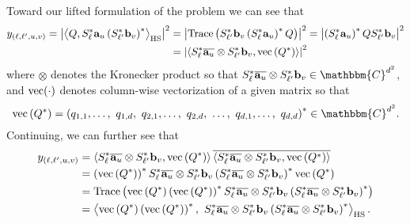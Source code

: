 \documentclass[]{spie}  %
\def \a {\mathbf a}
\def \b {\mathbf b}
\begin{document}
Toward our lifted formulation of the problem we can see that
\begin{align*}
y_{(\ell,\ell',u,v)} = \left| \left\langle Q, S^*_{\ell} \a_u \left(S^*_{\ell'} \b_v \right)^* \right\rangle_{\rm HS} \right|^2 &= \left| {\rm Trace}\left( S^*_{\ell'} \b_v  \left(S^*_{\ell} \a_u \right)^*Q \right) \right|^2  = \left|\left(S^*_{\ell} \a_u \right)^* Q S^*_{\ell'} \b_v \right|^2\\ 
&= \left| \left\langle S^*_{\ell} \overline{\a_u} \otimes S^*_{\ell'} \b_v, {\rm vec} \left(Q^* \right) \right\rangle \right|^2
\end{align*}
where $\otimes$ denotes the Kronecker product so that $S^*_{\ell} \overline{\a_u} \otimes S^*_{\ell'} \b_v \in \mathbbm{C}^{d^2}$, and ${\rm vec}(\cdot)$ denotes column-wise vectorization of a given matrix so that 
$${\rm vec} \left(Q^* \right) = \left( q_{1,1}, \dots, ~q_{1,d}, ~q_{2,1}, \dots, ~q_{2,d}, ~\dots, ~q_{d,1}, \dots, ~q_{d,d} \right)^* \in \mathbbm{C}^{d^2}.$$
Continuing, we can further see that 
\begin{align*}
y_{(\ell,\ell',u,v)} &=\left\langle S^*_{\ell} \overline{\a_u} \otimes S^*_{\ell'} \b_v, {\rm vec} \left(Q^* \right) \right\rangle \overline{\left\langle S^*_{\ell} \overline{\a_u} \otimes S^*_{\ell'} \b_v, {\rm vec} \left(Q^* \right) \right\rangle } \\
&= \left( {\rm vec} \left(Q^* \right) \right)^* S^*_{\ell} \overline{\a_u} \otimes S^*_{\ell'} \b_v \left( S^*_{\ell} \overline{\a_u} \otimes S^*_{\ell'} \b_v \right)^* {\rm vec}\left(Q^* \right) \\
&= {\rm Trace}\left( {\rm vec}\left(Q^* \right) \left( {\rm vec} \left(Q^* \right) \right)^* S^*_{\ell} \overline{\a_u} \otimes S^*_{\ell'} \b_v \left( S^*_{\ell} \overline{\a_u} \otimes S^*_{\ell'} \b_v \right)^* \right)\\
&=\left\langle  {\rm vec}\left(Q^* \right) \left( {\rm vec} \left(Q^* \right) \right)^*, ~S^*_{\ell} \overline{\a_u} \otimes S^*_{\ell'} \b_v \left( S^*_{\ell} \overline{\a_u} \otimes S^*_{\ell'} \b_v \right)^*\right\rangle_{\rm HS}.
\end{align*}
\end{document}
